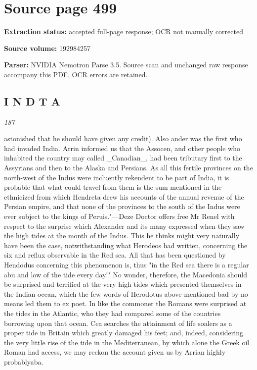 \clearpage
\section{Source page 499}
\textbf{Extraction status:} accepted full-page response; OCR not manually corrected\par
\textbf{Source volume:} 192984257\par
\textbf{Parser:} NVIDIA Nemotron Parse 3.5. Source scan and unchanged raw response accompany this PDF. OCR errors are retained.\par\medskip
\subsection*{I N D T A}
{\small\itshape 187\par}\medskip
astonished that he should have given any credit). Also ander was the first who had invaded India. Arrin informed us that the Assocen, and other people who inhabited the country may called \_Canadian\_, had been tributary first to the Assyrians and then to the Alaska and Persians. As all this fertile provinces on the north-west of the Indus were incluently rekendent to be part of India, it is probable that what could travel from them is the sum mentioned in the ethnicized from which Hendreta drew his accounts of the annual revenue of the Persian empire, and that none of the provinces to the south of the Indus were ever subject to the kings of Peruis."—Deze Doctor offers free Mr Renel with respect to the surprise which Alexander and its many expressed when they saw the high tides at the month of the Indus. This he thinks might very naturally have been the case, notwithstanding what Herodeos had written, concerning the six and reflux observable in the Red sea. All that has been questioned by Hendodus concerning this phenomenon is, thus "in the Red sea there is a regular abu and low of the tide every day!" No wonder, therefore, the Macedonia should be surprised and terrified at the very high tides which presented themselves in the Indian ocean, which the few words of Herodotus above-mentioned bad by no means led them to ex poet. In like the commoner the Romans were surprised at the tides in the Atlantic, who they had compared some of the countries borrowing upon that ocean. Cea searches the attainment of life soalers as a proper tide in Britain which greatly damaged his feet; and, indeed, considering the very little rise of the tide in the Mediterranean, by which alone the Greek oil Roman had access, we may reckon the account given us by Arrian highly probablyaba.\par\medskip

